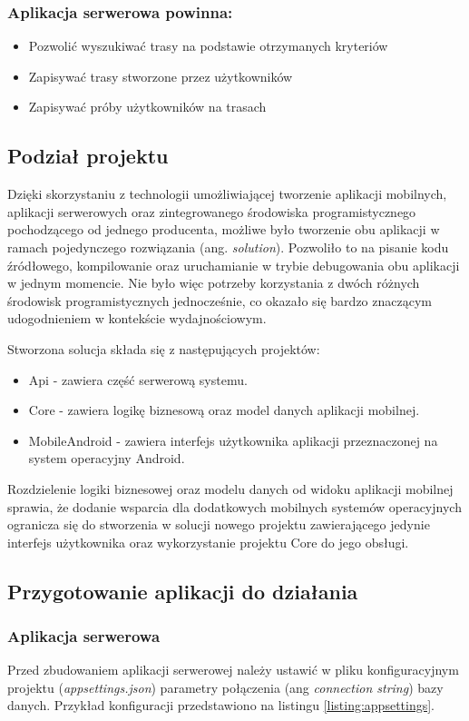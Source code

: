 \subsubsection{Aplikacja serwerowa powinna:}
\begin{itemize}
\item{Pozwolić wyszukiwać trasy na podstawie otrzymanych kryteriów}
\item{Zapisywać trasy stworzone przez użytkowników}
\item{Zapisywać próby użytkowników na trasach}
\end{itemize}

\subsection{Podział projektu}
Dzięki skorzystaniu z technologii umożliwiającej tworzenie aplikacji mobilnych, aplikacji serwerowych oraz zintegrowanego środowiska programistycznego pochodzącego od jednego producenta, możliwe było tworzenie obu aplikacji w ramach pojedynczego rozwiązania (ang. \textit{solution}). Pozwoliło to na pisanie kodu źródłowego, kompilowanie oraz uruchamianie w trybie debugowania obu aplikacji w jednym momencie. Nie było więc potrzeby korzystania z dwóch różnych środowisk programistycznych jednocześnie, co okazało się bardzo znaczącym udogodnieniem w kontekście wydajnościowym.

Stworzona solucja składa się z następujących projektów:
\begin{itemize}
\item{Api} - zawiera część serwerową systemu.
\item{Core} - zawiera logikę biznesową oraz model danych aplikacji mobilnej.
\item{MobileAndroid} - zawiera interfejs użytkownika aplikacji przeznaczonej na system operacyjny Android.
\end{itemize}
Rozdzielenie logiki biznesowej oraz modelu danych od widoku aplikacji mobilnej sprawia, że dodanie wsparcia dla dodatkowych mobilnych systemów operacyjnych ogranicza się do stworzenia w solucji nowego projektu zawierającego jedynie interfejs użytkownika oraz wykorzystanie projektu Core do jego obsługi.

\subsection{Przygotowanie aplikacji do działania}
\subsubsection{Aplikacja serwerowa}
Przed zbudowaniem aplikacji serwerowej należy ustawić w pliku konfiguracyjnym projektu (\textit{appsettings.json}) parametry połączenia (ang \textit{connection string}) bazy danych. Przykład konfiguracji przedstawiono na listingu \ref{listing:appsettings}.

